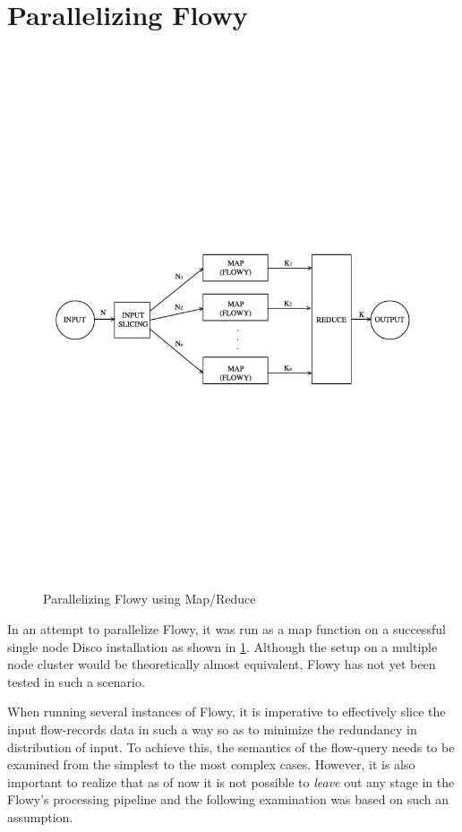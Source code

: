 \section{Parallelizing Flowy}\label{sec:parallel-flowy}
\begin{figure}[h!]
\begin{center}
  \includegraphics* [width=0.7\linewidth]{figures/flowy-mapreduce}
  \caption{Parallelizing Flowy using Map/Reduce \cite{pnemeth:thesis:2010}}
  \label{fig:flowy-mapreduce}
\end{center}
\end{figure}

In an attempt to parallelize Flowy, it was run as a map function on a
successful single node Disco installation as shown in
\ref{fig:flowy-mapreduce}. Although the setup on a multiple node cluster would
be theoretically almost equivalent, Flowy has not yet been tested in such a
scenario.

When running several instances of Flowy, it is imperative to effectively slice
the input flow-records data in such a way so as to minimize the redundancy in
distribution of input. To achieve this, the semantics of the flow-query needs
to be examined from the simplest to the most complex cases. However, it is
also important to realize that as of now it is not possible to \emph{leave}
out any stage in the Flowy's processing pipeline and the following examination
was based on such an assumption.

